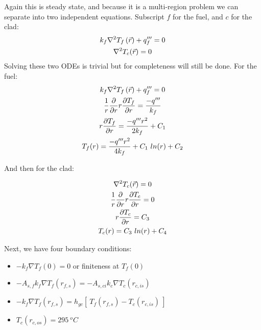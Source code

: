 \documentclass{article}
\begin{document}
Again this is steady state, and because it is a multi-region problem we can separate into two independent equations. Subscript $f$ for the fuel, and $c$ for the clad: 
\begin{equation}
    \begin{gathered}
        k_{f} \nabla^2 T_{f} \left(\Vec{r}\right) + q'''_{f} = 0\\
        \nabla^2 T_c(\Vec{r}) = 0
    \end{gathered}
\end{equation}
Solving these two ODEs is trivial but for completeness will still be done. For the fuel:
\begin{equation}
    \begin{gathered}
        k_{f} \nabla^2 T_{f} \left(\Vec{r}\right) + q'''_{f} = 0\\
        \frac{1}{r}\frac{\partial }{\partial r}r\frac{\partial T_f}{\partial r} = \frac{-q'''}{k_f}\\
        r\frac{\partial T_f}{\partial r} = \frac{-q'''r^2}{2k_f} + C_1 \\
        T_f(r) = \frac{-q'''r^2}{4k_f} + C_1 \ ln(r) + C_2
    \end{gathered}
\end{equation}

And then for the clad:

\begin{equation}
    \begin{gathered}
        \nabla^2 T_c(\Vec{r}) = 0 \\
        \frac{1}{r}\frac{\partial }{\partial r}r\frac{\partial T_c}{\partial r} = 0\\
        r\frac{\partial T_c}{\partial r} = C_3 \\
        T_c(r) = C_3 \ ln(r) + C_4
    \end{gathered}
\end{equation}


Next, we have four boundary conditions:\newline

\begin{adjustwidth}{130pt}{0pt}
    \begin{itemize}
        \item[\circled{\textbf{1}}] $\displaystyle-k_f\nabla T_f(0) = 0$ or finiteness at $T_f(0)$
        \item[\circled{\textbf{2}}] $\displaystyle -A_{s,f}k_f \nabla T_f(r_{f,s}) = -A_{s,ci}k_c \nabla T_c(r_{c,is})$
        \item[\circled{\textbf{3}}] $\displaystyle -k_f \nabla T_f(r_{f,s}) = h_{gc} \left[\ T_f(r_{f,s}) - T_c(r_{c,is})\ \right]$
        \item[\circled{\textbf{4}}] $\displaystyle T_c(r_{c,os}) = 295 \ ^oC$
    \end{itemize}
\end{adjustwidth}
\end{document}
